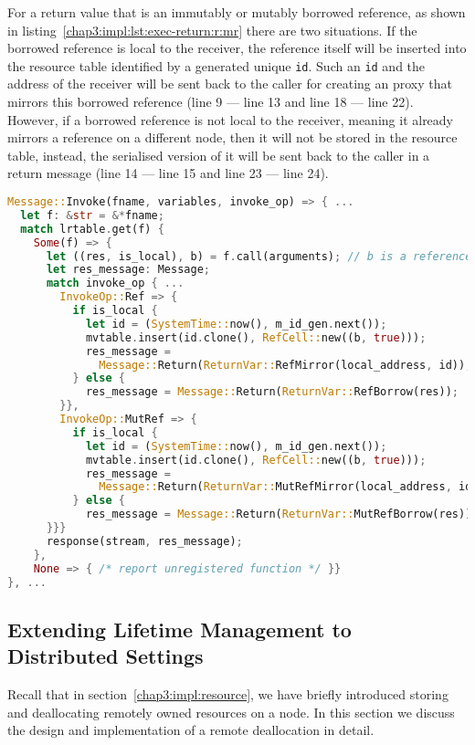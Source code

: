 For a return value that is an immutably or mutably borrowed reference, as shown in listing~\ref{chap3:impl:lst:exec-return:r:mr} there are two situations. 
If the borrowed reference is local to the receiver, the reference itself will be inserted into the resource table identified by a generated unique \lstinline{id}. Such an \lstinline{id} and the address of the receiver will be sent back to the caller for creating an proxy that mirrors this borrowed reference (line 9 --- line 13 and line 18 --- line 22). 
However, if a borrowed reference is not local to the receiver, meaning it already mirrors a reference on a different node, then it will not be stored in the resource table, instead, the serialised version of it will be sent back to the caller in a return message (line 14 --- line 15 and line 23 --- line 24).
\begin{lstlisting}[language=Rust, style=boxed, basicstyle=\footnotesize\ttfamily, caption={Executing an invocation and returning the result: \lstinline{Ref} and \lstinline{MutRef}}, label=chap3:impl:lst:exec-return:r:mr]
Message::Invoke(fname, variables, invoke_op) => { ...
  let f: &str = &*fname; 
  match lrtable.get(f) {
    Some(f) => {
      let ((res, is_local), b) = f.call(arguments); // b is a reference
      let res_message: Message;
      match invoke_op { ...
        InvokeOp::Ref => {
          if is_local {
            let id = (SystemTime::now(), m_id_gen.next());
            mvtable.insert(id.clone(), RefCell::new((b, true)));
            res_message =
              Message::Return(ReturnVar::RefMirror(local_address, id));
          } else { 
            res_message = Message::Return(ReturnVar::RefBorrow(res)); 
        }}, 
        InvokeOp::MutRef => {
          if is_local {
            let id = (SystemTime::now(), m_id_gen.next());
            mvtable.insert(id.clone(), RefCell::new((b, true)));
            res_message =
              Message::Return(ReturnVar::MutRefMirror(local_address, id));
          } else { 
            res_message = Message::Return(ReturnVar::MutRefBorrow(res)); 
      }}}
      response(stream, res_message);
    },
    None => { /* report unregistered function */ }}
}, ...
\end{lstlisting}

\subsection{Extending Lifetime Management to Distributed Settings}
\label{chap3:impl:lifetime}
Recall that in section~\ref{chap3:impl:resource}, we have briefly introduced storing and deallocating remotely owned resources on a node. In this section we discuss the design and implementation of a remote deallocation in detail. 

